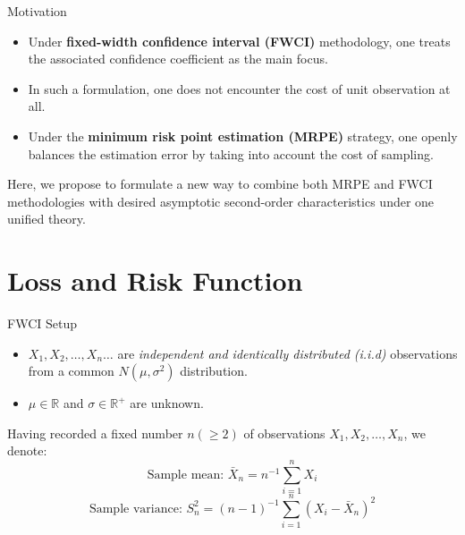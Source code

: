 \documentclass [xcolor=svgnames, t] {beamer}
\begin{document}
\begin{frame}{Motivation}
  \vspace{5mm}
\begin{itemize}
\item Under\textbf{ fixed-width confidence interval (FWCI)} methodology, one treats the associated confidence coefficient as the main focus.
\item  In such a formulation, one does not encounter the cost of unit observation at all.
\item  Under the \textbf{minimum risk point estimation (MRPE)} strategy, one openly balances the estimation
error by taking into account the cost of sampling.
\end{itemize}

Here, we propose to formulate a new way to combine both MRPE and FWCI methodologies
with desired asymptotic second-order characteristics under one unified theory.

\end{frame}



\section{Loss and Risk Function}
\begin{frame}{FWCI Setup}
  \vspace{5mm}
\begin{itemize}
\item $X_1,X_2, \dots ,X_n \dots$ are \textit{independent 
    and identically distributed (i.i.d)} observations from a common 
    $N(\mu,\sigma^2)$ distribution.
\item $\mu \in \mathbb{R}$ and $\sigma \in \mathbb{R}^{+}$ are unknown.
\end{itemize}

    Having recorded a fixed number $n (\geq 2)$ of observations $X_1,X_2,\dots,X_n$, we denote:
    $$\text{Sample mean: }\bar{X}_n=n^{-1}\sum_{i=1}^nX_i$$
    $$\text{Sample variance: }S_n^2=(n-1)^{-1}\sum_
    {i=1}^n {(X_i-\bar{X}_n)^2}$$
    \vspace{0.1cm}
    
    \end{frame}
\end{document}

